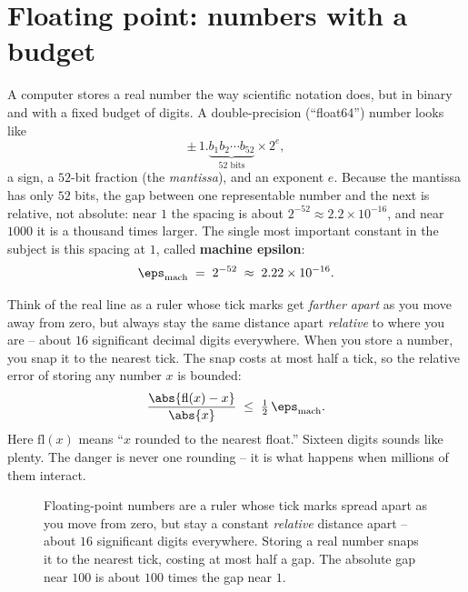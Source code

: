 \section{Floating point: numbers with a budget}

A computer stores a real number the way scientific notation does, but in binary and
with a fixed budget of digits. A double-precision (``float64'') number looks like
\[
  \pm\, 1.\underbrace{b_1 b_2 \cdots b_{52}}_{\text{52 bits}} \times 2^{e},
\]
a sign, a $52$-bit fraction (the \emph{mantissa}), and an exponent $e$. Because the
mantissa has only $52$ bits, the gap between one representable number and the next is
relative, not absolute: near $1$ the spacing is about $2^{-52}\approx 2.2\times
10^{-16}$, and near $1000$ it is a thousand times larger. The single most important
constant in the subject is this spacing at $1$, called \textbf{machine epsilon}:
\[
  \eps_{\text{mach}} \;=\; 2^{-52} \;\approx\; 2.22\times 10^{-16}.
\]

\begin{intuitionbox}
Think of the real line as a ruler whose tick marks get \emph{farther apart} as you
move away from zero, but always stay the same distance apart \emph{relative} to where
you are -- about $16$ significant decimal digits everywhere. When you store a number,
you snap it to the nearest tick. The snap costs at most half a tick, so the relative
error of storing any number $x$ is bounded:
\[
  \frac{\abs{\text{fl}(x) - x}}{\abs{x}} \;\le\; \tfrac12\,\eps_{\text{mach}}.
\]
Here $\text{fl}(x)$ means ``$x$ rounded to the nearest float.'' Sixteen digits sounds
like plenty. The danger is never one rounding -- it is what happens when millions of
them interact.
\end{intuitionbox}

\begin{figure}[H]
\centering
{}
\caption{Floating-point numbers are a ruler whose tick marks spread apart as you move
from zero, but stay a constant \emph{relative} distance apart -- about $16$ significant
digits everywhere. Storing a real number snaps it to the nearest tick, costing at most
half a gap. The absolute gap near $100$ is about $100$ times the gap near $1$.}
\label{ch33:ruler}
\end{figure}

